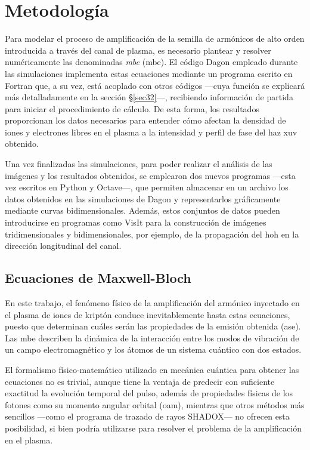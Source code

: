 \chapter{Metodología} \label{cap3}
Para modelar el proceso de amplificación de la semilla de armónicos de alto orden introducida a través del canal de plasma, es necesario plantear y resolver numéricamente las denominadas \emph{\acrlong{mbe}} (\acrshort{mbe}). El código Dagon empleado durante las simulaciones implementa estas ecuaciones mediante un programa escrito en Fortran que, a su vez, está acoplado con otros códigos ---cuya función se explicará más detalladamente en la sección \S\ref{sec32}---, recibiendo información de partida para iniciar el procedimiento de cálculo. De esta forma, los resultados proporcionan los datos necesarios para entender cómo afectan la densidad de iones y electrones libres en el plasma a la intensidad y perfil de fase del haz \acrshort{xuv} obtenido. 

Una vez finalizadas las simulaciones, para poder realizar el análisis de las imágenes y los resultados obtenidos, se emplearon dos nuevos programas ---esta vez escritos en Python y Octave---, que permiten almacenar en un archivo los datos obtenidos en las simulaciones de Dagon y representarlos gráficamente mediante curvas bidimensionales. Además, estos conjuntos de datos pueden introducirse en programas como VisIt para la construcción de imágenes tridimensionales y bidimensionales, por ejemplo, de la propagación del \acrshort{hoh} en la dirección longitudinal del canal.

\section{Ecuaciones de Maxwell-Bloch} \label{sec31}
En este trabajo, el fenómeno físico de la amplificación del armónico inyectado en el plasma de iones de kriptón conduce inevitablemente hasta estas ecuaciones, puesto que determinan cuáles serán las propiedades de la emisión obtenida (\acrshort{ase}). Las \acrshort{mbe} describen la dinámica de la interacción entre los modos de vibración de un campo electromagnético y los átomos de un sistema cuántico con dos estados. 

El formalismo físico-matemático utilizado en mecánica cuántica para obtener las ecuaciones no es trivial\autocite{Cohen-Tannoudji2019QuantumApplications,Cohen-Tannoudji2019QuantumMethods,Sakurai2020ModernMechanics,Milonni1988Lasers}, aunque tiene la ventaja de predecir con suficiente exactitud la evolución temporal del pulso, además de propiedades físicas de los fotones como su momento angular orbital (\acrshort{oam}), mientras que otros métodos más sencillos ---como el programa de trazado de rayos SHADOX--- no ofrecen esta posibilidad, si bien podría utilizarse para resolver el problema de la amplificación en el plasma.

